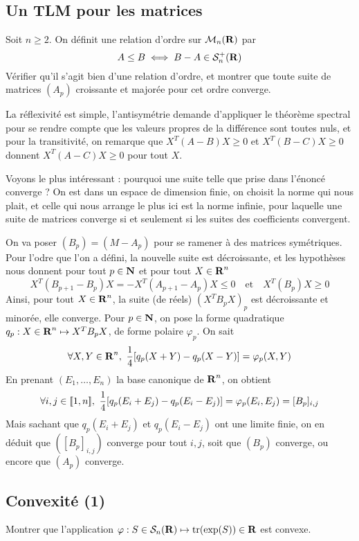 \subsection{Un TLM pour les matrices}
\begin{exercice}
	Soit $n\geq 2$.
	On définit une relation d'ordre sur $\mathcal M_n(\operatorname{\mathbf{R}})$ par 
	\[
		A\leq B\iff B-A\in\mathcal S_n^+(\operatorname{\mathbf{R}})	
	\]
	Vérifier qu'il s'agit bien d'une relation d'ordre, et montrer que toute suite de matrices $(A_p)$
	croissante et majorée pour cet ordre converge.
\end{exercice}

\begin{correction}
	La réflexivité est simple, l'antisymétrie demande d'appliquer le théorème spectral pour se rendre compte que les valeurs propres de la différence sont toutes nuls,
	et pour la transitivité, on remarque que $X^T(A-B)X\geq 0$ et $X^T(B-C)X\geq 0$ donnent $X^T(A-C)X\geq 0$ pour tout $X$.

	Voyons le plus intéressant : pourquoi une suite telle que prise dans l'énoncé converge ? 
	On est dans un espace de dimension finie, on choisit la norme qui nous plait, et celle qui nous arrange le plus ici est la norme infinie,
	pour laquelle une suite de matrices converge si et seulement si les suites des coefficients convergent. 

	On va poser $(B_p)=(M-A_p)$ pour se ramener à des matrices symétriques. 
	Pour l'odre que l'on a défini, la nouvelle suite est décroissante, et les 
	hypothèses nous donnent pour tout $p\in\operatorname{\mathbf{N}}$ et pour tout $X\in\mathcal {\operatorname{\mathbf{R}}}^n$
	\[
		X^T(B_{p+1}-B_p)X=-X^T(A_{p+1}-A_p)X\leq 0\quad\text{et}\quad X^T(B_p)X\geq 0	
	\]
	Ainsi, pour tout $X\in\mathcal {\operatorname{\mathbf{R}}}^n$, la suite (de réels) $(X^TB_pX)_p$ est décroissante et minorée,
	elle converge. 
	Pour $p\in\operatorname{\mathbf{N}}$, on pose la forme quadratique $q_p:X\in\operatorname{\mathbf{R}}^n\mapsto X^TB_pX$, de forme polaire $\varphi_p$. 
	On sait 
	\[
		\forall X,Y\in\R^n,\ \frac14[q_p(X+Y)-q_p(X-Y)]=\varphi_p(X,Y)
	\]
	En prenant $(E_1,\dots,E_n)$ la base canonique de $\operatorname{\mathbf{R}}^n$, on obtient 
	\[
		\forall i,j\in\inl1n,\ \frac14[q_p(E_i+E_j)-q_p(E_i-E_j)]=\varphi_p(E_i,E_j)=[B_p]_{i,j}
	\]
	Mais sachant que $q_p(E_i+E_j)$ et $q_p(E_i-E_j)$ ont une limite finie, on en déduit que $([B_p]_{i,j})$ converge pour tout $i,j$,
	soit que $(B_p)$ converge, ou encore que $(A_p)$ converge.
\end{correction}

\subsection{Convexité (1)}
\begin{exercice}
	Montrer que l'application $\varphi : S\in\mathcal S_n(\operatorname{\mathbf{R}})\mapsto \operatorname{tr}(\exp(S))\in\operatorname{\mathbf{R}}$ est convexe.
\end{exercice}

